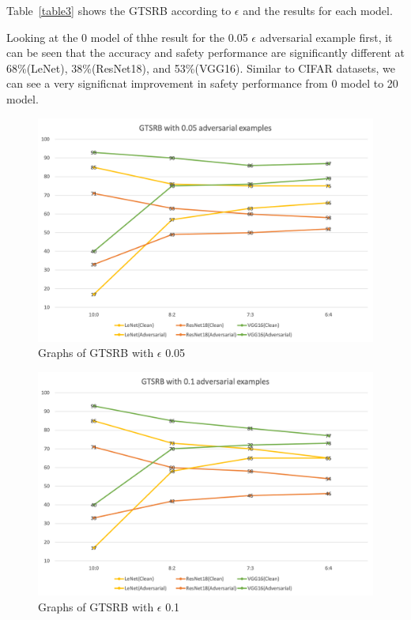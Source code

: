 \documentclass[journal,article,submit,moreauthors,pdftex]{Definitions/mdpi}
\begin{document}
Table~\ref{table3} shows the GTSRB according to \begin{math}\epsilon\end{math} and the results for each model.

Looking at the 0 model of thhe result for the 0.05 \begin{math}\epsilon\end{math} adversarial example first, it can be seen that the accuracy and safety performance are significantly different at 68\%(LeNet), 38\%(ResNet18), and 53\%(VGG16).
Similar to CIFAR datasets, we can see a very significnat improvement in safety performance from 0 model to 20 model.

\begin{figure}[H]
    \includegraphics[width=13 cm]{Definitions/graph-005gtsrb.png}
    \caption{Graphs of GTSRB with \begin{math}\epsilon\end{math} 0.05\label{graph5}}
\end{figure} 

\begin{figure}[H]
    \includegraphics[width=13 cm]{Definitions/graph-01gtsrb.png}
    \caption{Graphs of GTSRB with \begin{math}\epsilon\end{math} 0.1\label{graph6}}
\end{figure} 
\end{document}
